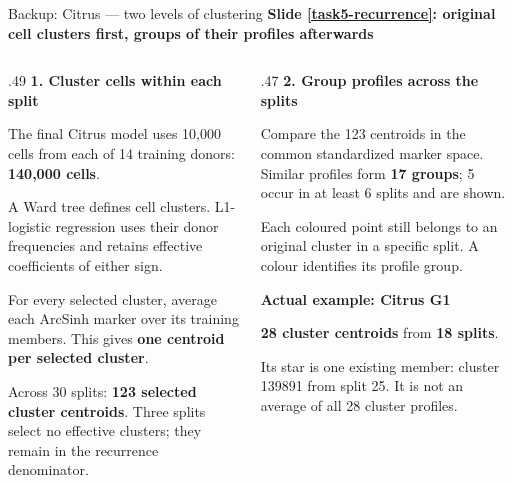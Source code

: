 \documentclass[aspectratio=169,10pt]{beamer}
\newcommand{\eyebrow}[1]{{\color{Teal}\bfseries #1}\par\smallskip}
\begin{document}
\begin{frame}{Backup: Citrus --- two levels of clustering}
  \small
  \eyebrow{Slide \ref{task5-recurrence}: original cell clusters first, groups of their profiles afterwards}
  \begin{columns}[T,onlytextwidth]
    \begin{column}{.49\textwidth}
      \textbf{1. Cluster cells within each split}\par\smallskip
      The final Citrus model uses 10,000 cells from each of 14 training donors: \textbf{140,000 cells}.\par\medskip
      A Ward tree defines cell clusters. L1-logistic regression uses their donor frequencies and retains effective coefficients of either sign.\par\medskip
      For every selected cluster, average each ArcSinh marker over its training members. This gives \textbf{one centroid per selected cluster}.\par\medskip
      Across 30 splits: \textbf{123 selected cluster centroids}. Three splits select no effective clusters; they remain in the recurrence denominator.
    \end{column}
    \begin{column}{.47\textwidth}
      \textbf{2. Group profiles across the splits}\par\smallskip
      Compare the 123 centroids in the common standardized marker space. Similar profiles form \textbf{17 groups}; 5 occur in at least 6 splits and are shown.\par\medskip
      Each coloured point still belongs to an original cluster in a specific split. A colour identifies its profile group.\par\medskip
      \eyebrow{Actual example: Citrus G1}
      \textbf{28 cluster centroids} from \textbf{18 splits}.\par\smallskip
      Its star is one existing member: cluster 139891 from split 25. It is not an average of all 28 cluster profiles.
    \end{column}
  \end{columns}
\end{frame}
\end{document}

